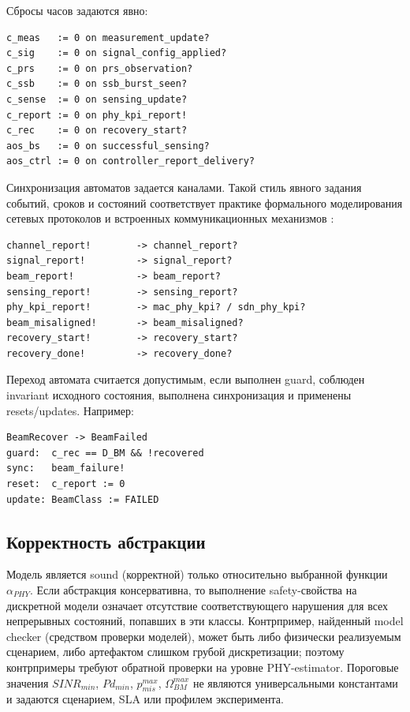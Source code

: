 \documentclass[12pt,a4paper]{article}
\begin{document}
Сбросы часов задаются явно:

\begin{verbatim}
c_meas   := 0 on measurement_update?
c_sig    := 0 on signal_config_applied?
c_prs    := 0 on prs_observation?
c_ssb    := 0 on ssb_burst_seen?
c_sense  := 0 on sensing_update?
c_report := 0 on phy_kpi_report!
c_rec    := 0 on recovery_start?
aos_bs   := 0 on successful_sensing?
aos_ctrl := 0 on controller_report_delivery?
\end{verbatim}

Синхронизация автоматов задается каналами. Такой стиль явного задания событий, сроков и состояний соответствует практике формального моделирования сетевых протоколов и встроенных коммуникационных механизмов \cite{anand2007afdx}:

\begin{verbatim}
channel_report!        -> channel_report?
signal_report!         -> signal_report?
beam_report!           -> beam_report?
sensing_report!        -> sensing_report?
phy_kpi_report!        -> mac_phy_kpi? / sdn_phy_kpi?
beam_misaligned!       -> beam_misaligned?
recovery_start!        -> recovery_start?
recovery_done!         -> recovery_done?
\end{verbatim}

Переход автомата считается допустимым, если выполнен guard, соблюден invariant исходного состояния, выполнена синхронизация и применены resets/updates. Например:

\begin{verbatim}
BeamRecover -> BeamFailed
guard:  c_rec == D_BM && !recovered
sync:   beam_failure!
reset:  c_report := 0
update: BeamClass := FAILED
\end{verbatim}

\subsection{Корректность абстракции}

Модель является sound (корректной) только относительно выбранной функции $\alpha_{PHY}$. Если абстракция консервативна, то выполнение safety-свойства на дискретной модели означает отсутствие соответствующего нарушения для всех непрерывных состояний, попавших в эти классы. Контрпример, найденный model checker (средством проверки моделей), может быть либо физически реализуемым сценарием, либо артефактом слишком грубой дискретизации; поэтому контрпримеры требуют обратной проверки на уровне PHY-estimator. Пороговые значения $SINR_{min}$, $Pd_{min}$, $p_{mis}^{max}$, $\Omega_{BM}^{max}$ не являются универсальными константами и задаются сценарием, SLA или профилем эксперимента.
\end{document}
